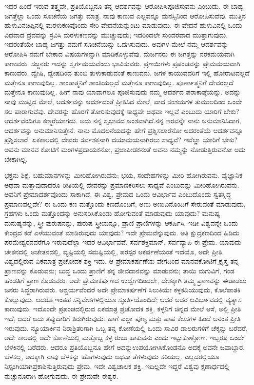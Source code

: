 ಇದರ ಹಿಂದೆ ಇರುವ ತತ್ತ್ವವೇ, ಪ್ರತಿಯೊಬ್ಬನೂ ತನ್ನ ಆದರ್ಶವನ್ನು ಆರೋಪಿಸಿ\break ಪೂಜಿಸುವನು ಎಂಬುದು. ಈ ಬಾಹ್ಯ ಜಗತ್ತೆಲ್ಲಾ ಒಂದು ಸೂಚನೆಯ ಜಗತ್ತು ಮಾತ್ರ. ನಾವು ಕಾಣುವ ಎಲ್ಲವನ್ನೂ ಮನಸ್ಸಿನಿಂದ ಆರೋಪಿಸುವೆವು. ಮುತ್ತಿನ ಹುಳುವಿನ\break ಚಿಪ್ಪಿನಲ್ಲಿ ಮರಳುಕಣವೊಂದು ಸೇರಿ ವೇದನೆಯನ್ನುಂಟು ಮಾಡುವುದು. ಈ ವೇದನೆ ಹುಳುವಿನಲ್ಲಿ ಒಂದು ವಿಧವಾದ ದ್ರವವನ್ನು ಸ್ರವಿಸಿ ಮರಳುಕಣವನ್ನು ಮುಚ್ಚುವುದು; ಇದರಿಂದಲೇ ಸುಂದರವಾದ ಮುತ್ತಾಗುವುದು. ಇದರಂತೆಯೇ ಬಾಹ್ಯ ಜಗತ್ತು ನಮಗೆ ಸೂಚನೆಯನ್ನು ಒದಗಿಸುವುದು. ಅವುಗಳ ಮೇಲೆ ನಮ್ಮ ಆದರ್ಶವನ್ನು ಆರೋಪಿಸಿ ನಮಗೆ ಬೇಕಾದ ವಿಷಯ\-ಗಳನ್ನಾಗಿ ಮಾಡಿಕೊಳ್ಳುವೆವು. ದುರ್ಜನರು ಈ ಜಗತ್ತನ್ನು ನರಕಮಯವಾಗಿ ಕಾಣುವರು. ಸಜ್ಜನರು ಇದನ್ನು ಸ್ವರ್ಗಮಯವೆಂದು ಭಾವಿಸುವರು. ಪ್ರಣಯಿಗಳು ಪ್ರಪಂಚವನ್ನು ಪ್ರೇಮಮಯವಾಗಿ ಕಾಣುವರು. ದ್ವೇಷಿ, ದ್ವೇಷದಿಂದ ತುಂಬಿ ತುಳುಕಾಡುವಂತೆ ಕಾಣುವನು. ಜಗಳ ಕಾಯುವವರಿಗೆ ಇಲ್ಲಿ ಹೋರಾಟವಲ್ಲದೆ ಮತ್ತೇನೂ ಕಾಣುವುದಿಲ್ಲ. ಶಾಂತಾತ್ಮನಿಗೆ ಶಾಂತಿಯಲ್ಲದೆ ಮತ್ತೇನೂ ಕಾಣುವುದಿಲ್ಲ. ಪೂರ್ಣಾತ್ಮನಿಗೆ ದೇವರಲ್ಲದೆ ಮತ್ತೇನೂ ಕಾಣುವುದಿಲ್ಲ. ಹೀಗೆ ನಾವು ಯಾವಾಗಲೂ ಪೂಜಿಸುವುದು ನಮ್ಮ ಆದರ್ಶದ ಪರಾಕಾಷ್ಠೆಯನ್ನು. ಅದನ್ನು ನಾವು ಮುಟ್ಟಿದ ಮೇಲೆ, ಆದರ್ಶವನ್ನು ಆದರ್ಶದಂತೆ ಪ್ರೀತಿಸಿದ ಮೇಲೆ, ವಾದ ಸಂಶಯಗಳ ತುಮುಲದಿಂದ ಒಂದೇ ಸಲ ಪಾರಾಗುವೆವು. ದೇವರನ್ನು ಹೊರಗೆ ತೋರಿಸುವುದಕ್ಕೆ ಸಾಧ್ಯವೇ ಅಥವಾ ಇಲ್ಲವೆ ಎಂಬುದು ಯಾರಿಗೆ ಬೇಕು? ಆದರ್ಶವೆಂದಿಗೂ ಕಣ್ಮರೆಯಾಗದು. ಅದು ನನ್ನ ಸ್ವಭಾವದ ಅಂಶವಾಗಿದೆ.\break ನನ್ನ ಇರವನ್ನೇ ನಾನು ಅನುಮಾನಿಸಿದಾಗ, ಆದರ್ಶವನ್ನು ಅನುಮಾನಿಸುತ್ತೇನೆ. ನಾನು ಮೊದಲ\-ನೆಯದನ್ನು ಹೇಗೆ ಪ್ರಶ್ನಿಸಲಾರೆನೋ ಅದರಂತೆಯೆ ಆದರ್ಶವನ್ನೂ ಪ್ರಶ್ನಿಸಲಾರೆ. ಏಕಕಾಲದಲ್ಲಿ ದೇವರು ಸರ್ವಶಕ್ತನಾಗಿ ದಯಾಮಯನಾಗಿರಲು ಸಾಧ್ಯವೆ? ಇವೆಲ್ಲಾ ಯಾರಿಗೆ ಬೇಕು? ಅವನು ಮಾನವ ಕೋಟಿಗೆ ಮಂಗಳಪ್ರದಾಯಕನೋ, ಪ್ರಜಾಪೀಡಕನಂತೆ ಅವನು ನಮ್ಮನ್ನು ನೋಡುತ್ತಿರುವನೋ ಅದು ಬೇಕಾಗಿಲ್ಲ.

ಭಕ್ತನು ಶಿಕ್ಷೆ, ಬಹುಮಾನಗಳನ್ನು ಮೀರಿಹೋಗಿರುವನು; ಭಯ, ಸಂದೇಹಗಳನ್ನು ಮೀರಿ ಹೋಗಿರುವನು. ವೈಜ್ಞಾನಿಕ ಅಥವಾ ಮತ್ತಾವುದಾದರೂ ರೀತಿಯಲ್ಲಿ ದೇವರನ್ನು ಪ್ರಮಾಣಿಕರಿಸಲು ಸಾಧ್ಯವೆ ಎಂಬುದನ್ನು ಮೀರಿಹೋಗಿರುವನು. ಅವನಿಗೆ ಪ್ರೇಮಾದರ್ಶ\-ವೊಂದು ಸಾಕಾಗಿದೆ. ಈ ವಿಶ್ವ, ಪ್ರೇಮದ ಒಂದು ಆವಿರ್ಭಾವ ಎಂಬುದೊಂದು ಸ್ವತಸ್ಸಿದ್ಧ ಪ್ರಮಾಣವಲ್ಲವೇ? ಈ ಒಂದು ಕಣ ಮತ್ತೊಂದು ಕಣದೊಂದಿಗೆ, ಅಣು ಅಣುವಿನೊಂದಿಗೆ ಸೇರುವಂತೆ ಮಾಡುವುದು, ಗ್ರಹಗಳು ಒಂದು ಮತ್ತೊಂದನ್ನು ಅನುಸರಿಸಿಕೊಂಡು ಹೋಗುವಂತೆ ಮಾಡುವುದು ಯಾವುದು? ಮನುಷ್ಯ ಮನುಷ್ಯನನ್ನು, ಸ್ತ್ರೀ ಪುರುಷನನ್ನು, ಪುರುಷ ಸ್ತ್ರೀಯನ್ನೂ, ಪ್ರಾಣಿ ಪ್ರಾಣಿಗಳನ್ನು ಆಕರ್ಷಿಸಿ, ಇಡೀ ವಿಶ್ವವನ್ನೇ ಒಂದು ಕೇಂದ್ರದ ಕಡೆ ಎಳೆಯುವಂತೆ ಮಾಡಿರುವುದು ಯಾವುದು? ಇದೇ ಪ್ರೇಮವೆನ್ನುವುದು. ಅತಿ ಕ್ಷುದ್ರಕಣದಿಂದ ಹಿಡಿದು ಪರಮೇಶ್ವರನವರೆಗೂ ಇರುವುದೆಲ್ಲಾ ಇದರ ಆವಿರ್ಭಾವವೆ. ಸರ್ವಶಕ್ತಿಮಾನ್​, ಸರ್ವವ್ಯಾಪಿ ಈ ಪ್ರೇಮ. ಯಾವುದು ಚೇತನದಲ್ಲಿ ಅಚೇತನದಲ್ಲಿ, ವ್ಯಷ್ಟಿಯಲ್ಲಿ ಸಮಷ್ಟಿಯಲ್ಲಿ, ಪರಸ್ಪರ ಆಕರ್ಷಣೆಯಂತೆ ಇದೆಯೊ, ಅದೇ ಪ್ರೀತಿ. ವಿಶ್ವದಲ್ಲಿರುವ ಏಕಮಾತ್ರ ಪ್ರಚೋದಕ ಶಕ್ತಿ ಇದು. ಆ ಪ್ರೇಮಾಕರ್ಷಣೆಯ ವೇಗದಿಂದ ಮಾನವ\-ಕೋಟಿಗೆ ಕ್ರೈಸ್ತ ತನ್ನ ಪ್ರಾಣವನ್ನು ಕೊಡುವನು; ಬುದ್ಧ ಒಂದು ಪ್ರಾಣಿಗೆ ತನ್ನ ಜೀವದಾನವನ್ನು ಮಾಡುವನು; ತಾಯಿ ಮಗುವಿಗೆ, ಗಂಡ ಹೆಂಡತಿಗೆ ಪ್ರಾಣ ಕೊಡುವರು. ಅದೇ ಪ್ರೇಮಾಕರ್ಷಣದ ಉದ್ವೇಗದಿಂದಲೇ, ದೇಶಕ್ಕಾಗಿ ತಮ್ಮ ಪ್ರಾಣವನ್ನು ಈಡಾಡಲು ಜನರು ಸಿದ್ಧರಾಗಿರುವರು. ಆಶ್ಚರ್ಯವೆಂದರೆ ಅದೇ ಪ್ರೇಮಾಕರ್ಷಣೆಗೆ ಸಿಲುಕಿಯೇ ಕಳ್ಳ\break ಕದಿಯುವುದು, ಕೊಲೆಪಾತಕಿ ಕೊಲ್ಲುವುದು. ಆದರೂ ಇಂತಹ ಸನ್ನಿವೇಶಗಳಲ್ಲಿಯೂ ಸ್ಫೂರ್ತಿಯೊಂದಿದೆ; ಆದರೆ ಅದರ ಆವಿರ್ಭಾವದಲ್ಲಿ ವ್ಯತ್ಯಾಸ ಕಾಣುವುದು. ಇದೊಂದೇ ಪ್ರಪಂಚದಲ್ಲಿರುವ ಏಕಮಾತ್ರ ಪ್ರಚೋದಕ ಶಕ್ತಿ. ಕಳ್ಳನಿಗೆ ಚಿನ್ನದ ಮೇಲೆ ಆಸೆ, ಅಲ್ಲಿ ಪ್ರೀತಿ ಇದೆ, ಆದರೆ ಅದು ತಪ್ಪುದಾರಿಗೆ ತಿರುಗಿರುವುದು. ಹಾಗೆ ಎಲ್ಲಾ ಪುಣ್ಯ ಮತ್ತು ಪಾಪ ಕೆಲಸಗಳ ಹಿಂದೆ ಅನಂತ ಪ್ರೀತಿ ಇರುವುದು. ನ್ಯೂಯಾರ್ಕಿನ ನಿರಾಶ್ರಿತರಿಗಾಗಿ ಒಬ್ಬ ತನ್ನ ಕೋಣೆಯಲ್ಲಿ ಒಂದು ಸಾವಿರ ಡಾಲರುಗಳಿಗೆ ಚೆಕ್ಕನ್ನು ಬರೆದರೆ, ಅದೇ ಕಾಲದಲ್ಲಿ ಅದೇ ಕೋಣೆಯಲ್ಲಿ ಮತ್ತೊಬ್ಬ ಕಳ್ಳ ರುಜು ಹಾಕುವನು ಎಂದು ಇಟ್ಟುಕೊಳ್ಳೋಣ. ಇಬ್ಬರೂ ಒಂದೇ ಬೆಳಕಿನಲ್ಲಿ ಬರೆದರು. ಆದರೂ ಪ್ರತಿಯೊಬ್ಬನೂ ಹೇಗೆ ಅದನ್ನು\break ಉಪಯೋಗಿಸಿಕೊಂಡನೊ ಅದಕ್ಕೆ ಅವನೇ ಜವಾಬ್ದಾರ, ಬೆಳಕಲ್ಲ, ಅದಕ್ಕಾಗಿ ನಾವು ಬೆಳಕನ್ನು ಹೊಗಳುವುದು ಅಥವಾ ತೆಗಳುವುದು ಸರಿಯಲ್ಲ. ಎಲ್ಲದರಲ್ಲಿಯೂ ನಿಸ್ಸಂಗಿಯಾಗಿ\break ಪ್ರಕಾಶಿಸುತ್ತಿರುವುದು ಪ್ರೇಮ. ಇದೇ ವಿಶ್ವಚಾಲಕ ಶಕ್ತಿ. ಇದಿಲ್ಲದೇ ಇದ್ದರೆ ವಿಶ್ವವು ಕ್ಷಣಾರ್ಧದಲ್ಲಿ ನುಚ್ಚುನೂರಾಗಿ ಹೋಗುವುದು. ಈ ಪ್ರೇಮವೇ ಈಶ್ವರ.

